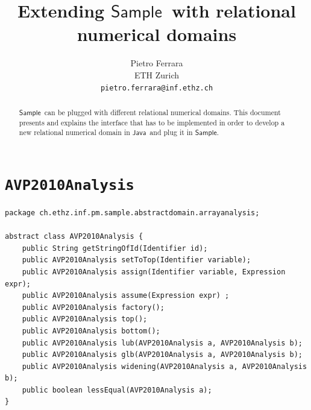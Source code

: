 \documentclass[11pt]{article}
\newcommand{\ScalaAnalyzer}{\ensuremath{\mathsf{Sample}}}
\newcommand{\statement}[1]{\lstinline{#1}}
\newcommand{\Java}{\ensuremath{\mathsf{Java}}}
\begin{document}
\title{Extending \ScalaAnalyzer\ with relational numerical domains}

\author{
Pietro Ferrara\\
ETH Zurich\\
\texttt{pietro.ferrara@inf.ethz.ch}
}

\maketitle

\begin{abstract}
\ScalaAnalyzer\ can be plugged with different relational numerical domains. This document presents and explains the interface that has to be implemented in order to develop a new relational numerical domain in \Java\ and plug it in \ScalaAnalyzer.
\end{abstract}


\section{\statement{AVP2010Analysis}}

\begin{lstlisting}
package ch.ethz.inf.pm.sample.abstractdomain.arrayanalysis;

abstract class AVP2010Analysis {
	public String getStringOfId(Identifier id);
	public AVP2010Analysis setToTop(Identifier variable);
	public AVP2010Analysis assign(Identifier variable, Expression expr);
	public AVP2010Analysis assume(Expression expr) ;
	public AVP2010Analysis factory();
	public AVP2010Analysis top();
	public AVP2010Analysis bottom();
	public AVP2010Analysis lub(AVP2010Analysis a, AVP2010Analysis b);
	public AVP2010Analysis glb(AVP2010Analysis a, AVP2010Analysis b);
	public AVP2010Analysis widening(AVP2010Analysis a, AVP2010Analysis b);
	public boolean lessEqual(AVP2010Analysis a);
}
\end{lstlisting}
\end{document}
